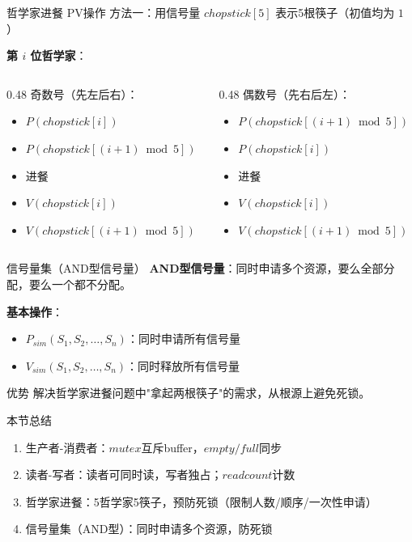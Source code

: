 \documentclass[10pt, aspectratio=169]{beamer}
\begin{document}
\begin{frame}{哲学家进餐 PV操作}
    方法一：用信号量 $chopstick[5]$ 表示5根筷子（初值均为 $1$）

    \vspace{0.5em}
    \textbf{第 $i$ 位哲学家}：
    \begin{columns}
        \begin{column}{0.48\textwidth}
            奇数号（先左后右）：
            \begin{itemize}
                \item $P(chopstick[i])$
                \item $P(chopstick[(i+1)\bmod 5])$
                \item 进餐
                \item $V(chopstick[i])$
                \item $V(chopstick[(i+1)\bmod 5])$
            \end{itemize}
        \end{column}
        \begin{column}{0.48\textwidth}
            偶数号（先右后左）：
            \begin{itemize}
                \item $P(chopstick[(i+1)\bmod 5])$
                \item $P(chopstick[i])$
                \item 进餐
                \item $V(chopstick[i])$
                \item $V(chopstick[(i+1)\bmod 5])$
            \end{itemize}
        \end{column}
    \end{columns}
\end{frame}

\begin{frame}{信号量集（AND型信号量）}
    \textbf{AND型信号量}：同时申请多个资源，要么全部分配，要么一个都不分配。

    \vspace{0.5em}
    \textbf{基本操作}：
    \begin{itemize}
        \item $P_{sim}(S_1, S_2, \dots, S_n)$：同时申请所有信号量
        \item $V_{sim}(S_1, S_2, \dots, S_n)$：同时释放所有信号量
    \end{itemize}
    \vspace{0.5em}
    \begin{block}{优势}
        解决哲学家进餐问题中"拿起两根筷子"的需求，从根源上避免死锁。
    \end{block}
\end{frame}

\begin{frame}{本节总结}
    \begin{enumerate}
        \item 生产者-消费者：$mutex$互斥buffer，$empty/full$同步
        \item 读者-写者：读者可同时读，写者独占；$readcount$计数
        \item 哲学家进餐：5哲学家5筷子，预防死锁（限制人数/顺序/一次性申请）
        \item 信号量集（AND型）：同时申请多个资源，防死锁
    \end{enumerate}
\end{frame}
\end{document}
